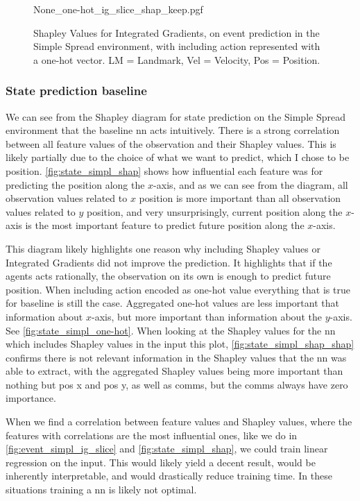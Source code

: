 \documentclass[UKenglish]{uiomasterthesis}
\begin{document}
\begin{figure}[H]
    \centering
{None_one-hot_ig_slice_shap_keep.pgf}
\caption{Shapley Values for Integrated Gradients, on event prediction in the Simple Spread environment, with including action represented with a one-hot vector. LM = Landmark, Vel = Velocity, Pos = Position.}
\label{fig:event_simpl_one-hot_ig_slice}
\end{figure}

\subsubsection{State prediction baseline}
We can see from the Shapley diagram for state prediction on the Simple Spread environment that the baseline \ac{nn} acts intuitively. There is a strong correlation between all feature values of the observation and their Shapley values. This is likely partially due to the choice of what we want to predict, which I chose to be position. \cref{fig:state_simpl_shap} shows how influential each feature was for predicting the position along the $x$-axis, and as we can see from the diagram, all observation values related to $x$ position is more important than all observation values related to $y$ position, and very unsurprisingly, current position along the $x$-axis is the most important feature to predict future position along the $x$-axis.

This diagram likely highlights one reason why including Shapley values or Integrated Gradients did not improve the prediction. It highlights that if the agents acts rationally, the observation on its own is enough to predict future position. When including action encoded as one-hot value everything that is true for baseline is still the case. Aggregated one-hot values are less important that information about $x$-axis, but more important than information about the $y$-axis. See \cref{fig:state_simpl_one-hot}. When looking at the Shapley values for the \ac{nn} which includes Shapley values in the input this plot, \cref{fig:state_simpl_shap_shap} confirms there is not relevant information in the Shapley values that the \ac{nn} was able to extract, with the aggregated Shapley values being more important than nothing but pos x and pos y, as well as comms, but the comms always have zero importance.

When we find a correlation between feature values and Shapley values, where the features with correlations are the most influential ones, like we do in \cref{fig:event_simpl_ig_slice} and \cref{fig:state_simpl_shap}, we could train linear regression on the input. This would likely yield a decent result, would be inherently interpretable, and would drastically reduce training time. In these situations training a \ac{nn} is likely not optimal.
\end{document}
